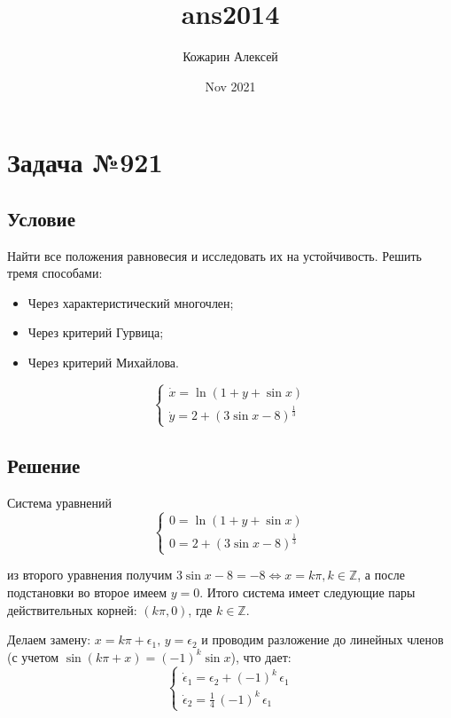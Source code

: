 \documentclass[a4paper,12pt]{article}
\title{ans2014}
\author{Кожарин Алексей}
\date{Nov 2021}
\begin{document}
	
\section{Задача №921}

    \subsection{Условие}
    Найти все положения равновесия и исследовать их на устойчивость.
    Решить тремя способами:
    \begin{itemize}
        \item Через характеристический многочлен;
        \item Через критерий Гурвица;
        \item Через критерий Михайлова.
    \end{itemize}

    \begin{equation}
        \begin{cases}
            \dot x = \ln (1 + y + \sin x) \\
        \dot y = 2 + (3 \sin x - 8)^{\frac{1}{3}}
        \end{cases}
    \end{equation}

    \subsection{Решение}
    Система уравнений
    \begin{equation}
        \begin{cases}
            0 = \ln (1 + y + \sin x) \\
            0 = 2 + (3 \sin x - 8)^{\frac{1}{3}}
        \end{cases}
    \end{equation}

    из второго уравнения получим $3 \sin x - 8 = -8 \Leftrightarrow x = k \pi, k \in \mathbb{Z}$, а после подстановки во второе имеем $ y = 0$.
    Итого система имеет следующие пары действительных корней: $(k \pi, 0)$, где $k \in \mathbb{Z}$.

    Делаем замену: $x = k\pi + \epsilon_1,\, y=\epsilon_2$ и проводим разложение до линейных членов (с учетом $\sin (k\pi + x) = (-1)^k \sin x$), что дает:
    \begin{equation}
        \begin{cases}
            \dot \epsilon_1 = \epsilon_2 + (-1)^k\, \epsilon_1 \\
            \dot \epsilon_2 = \frac{1}{4}\,(-1)^k\,\epsilon_1
        \end{cases}
    \end{equation}
\end{document}
